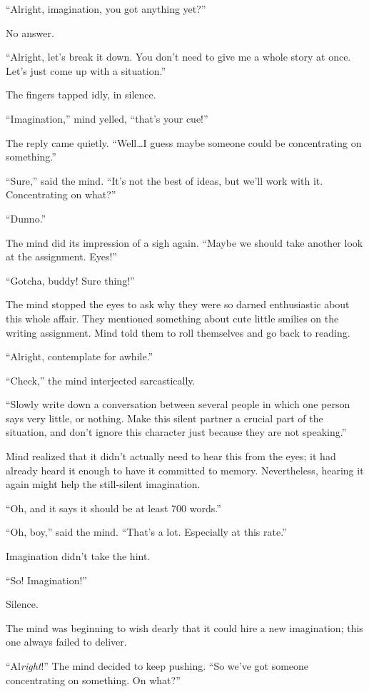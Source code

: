 \documentclass[10pt]{article}
\begin{document}
\vskip 1cm

``Alright, imagination, you got anything yet?''

No answer.

``Alright, let's break it down.  You don't need to give me a whole
story at once.  Let's just come up with a situation.''

The fingers tapped idly, in silence.

``Imagination,'' mind yelled, ``that's your cue!''

The reply came quietly.  ``Well\ldots I guess maybe someone could be
concentrating on something.''

``Sure,'' said the mind. ``It's not the best of ideas, but we'll work
with it.  Concentrating on what?''

``Dunno.''

The mind did its impression of a sigh again.  ``Maybe we should take
another look at the assignment.  Eyes!''

``Gotcha, buddy! Sure thing!''

The mind stopped the eyes to ask why they were so darned enthusiastic
about this whole affair.  They mentioned something about cute little
smilies on the writing assignment.  Mind told them to roll themselves
and go back to reading.

``Alright, contemplate for awhile.''

``Check,'' the mind interjected sarcastically.

``Slowly write down a conversation between several people in which one
person says very little, or nothing.  Make this silent partner a crucial
part of the situation, and don't ignore this character just because they
are not speaking.''

Mind realized that it didn't actually need to hear this from the eyes;
it had already heard it enough to have it committed to memory.
Nevertheless, hearing it again might help the still-silent imagination.

``Oh, and it says it should be at least 700 words.''

``Oh, boy,'' said the mind. ``That's a lot.  Especially at this rate.''

Imagination didn't take the hint.

``So! Imagination!''

Silence.

The mind was beginning to wish dearly that it could hire a new
imagination; this one always failed to deliver.

``Al\emph{right}!'' The mind decided to keep pushing. ``So we've got
someone concentrating on something.  On what?''
\end{document}
